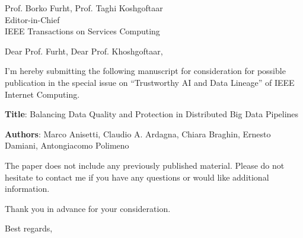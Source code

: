 \documentclass[12pt]{sriletter}
\begin{document}
\signature{\vspace*{-1.4cm}\\
    Claudio Ardagna}

\faxnumber{}

\begin{letter}{%
        Prof. Borko Furht, Prof.  Taghi Koshgoftaar \\
        Editor-in-Chief\\
        IEEE Transactions on Services Computing\\
    }

    \opening{Dear Prof. Furht, Dear Prof. Khoshgoftaar,}

    I'm hereby submitting the following manuscript for consideration for possible publication in the special issue on ``Trustworthy AI and Data Lineage'' of IEEE Internet Computing.

    \textbf{Title}: Balancing Data Quality and Protection in Distributed Big Data Pipelines

    \textbf{Authors}: Marco Anisetti, Claudio A. Ardagna, Chiara Braghin, Ernesto Damiani, Antongiacomo Polimeno

    The paper does not include any previously published material. Please do not hesitate to contact me if you have any questions or would like additional information.

    Thank you in advance for your consideration.

    \closing{Best regards,}

\end{letter}
\end{document}
